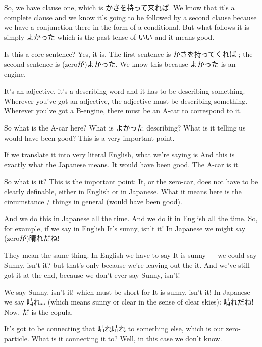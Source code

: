 So, we have clause one, which is かさを持って来れば. We know that it's a complete clause and we know it's going to be followed by a second clause because we have a conjunction there in the form of a conditional. But what follows it is simply よかった which is the past tense of いい and it means good.

Is this a core sentence? Yes, it is. The first sentence is かさを持ってくれば ; the second sentence is (zeroが)よかった. We know this because よかった is an engine.

{}

It's an adjective, it's a describing word and it has to be describing something. Wherever you've got an adjective, the adjective must be describing something. Wherever you've got a B-engine, there must be an A-car to correspond to it.

So what is the A-car here? What is よかった describing? What is it telling us would have been good? This is a very important point.

If we translate it into very literal English, what we're saying is  And this is exactly what the Japanese means. It would have been good. The A-car is it.

So what is it? This is the important point: It, or the zero-car, does not have to be clearly definable, either in English or in Japanese. What it means here is the circumstance / things in general (would have been good).

And we do this in Japanese all the time. And we do it in English all the time. So, for example, if we say in English It's sunny, isn't it! In Japanese we might say (zeroが)晴れだね!

{}

They mean the same thing. In English we have to say It is sunny --- we could say Sunny, isn't it? but that's only because we're leaving out the it. And we've still got it at the end, because we don't ever say Sunny, isn't!

We say Sunny, isn't it! which must be short for It is sunny, isn't it! In Japanese we say 晴れ\ldots{} (which means sunny or clear in the sense of clear skies): 晴れだね! Now, だ is the copula.

It's got to be connecting that 晴れ晴れ to something else, which is our zero-particle. What is it connecting it to? Well, in this case we don't know.

